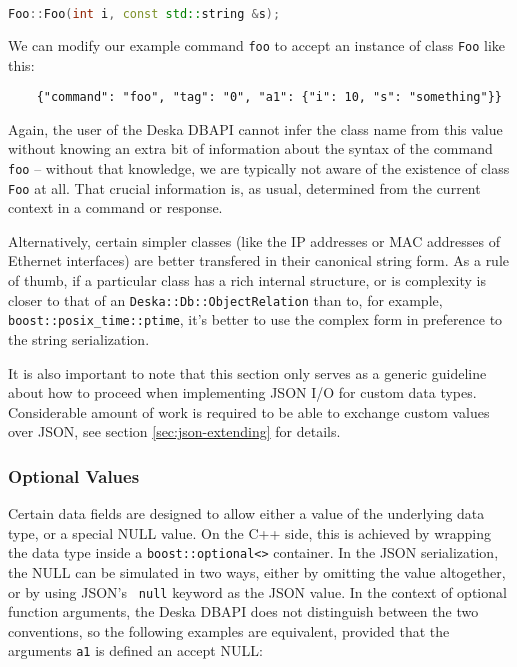 \documentclass{article}
\begin{document}
\begin{lstlisting}[language=c++]
    Foo::Foo(int i, const std::string &s);
\end{lstlisting}

We can modify our example command {\tt foo} to accept an instance of class {\tt Foo} like this:

\begin{lstlisting}
    {"command": "foo", "tag": "0", "a1": {"i": 10, "s": "something"}}
\end{lstlisting}

Again, the user of the Deska DBAPI cannot infer the class name from this value without knowing an extra bit of
information about the syntax of the command {\tt foo} -- without that knowledge, we are typically not aware of the
existence of class {\tt Foo} at all.  That crucial information is, as usual, determined from the current context in a
command or response.

Alternatively, certain simpler classes (like the IP addresses or MAC addresses of Ethernet interfaces) are better
transfered in their canonical string form.  As a rule of thumb, if a particular class has a rich internal structure, or
is complexity is closer to that of an {\tt Deska::Db::ObjectRelation} than to, for example, {\tt
boost::posix\_time::ptime}, it's better to use the complex form in preference to the string serialization.

It is also important to note that this section only serves as a generic guideline about how to proceed when implementing
JSON I/O for custom data types.  Considerable amount of work is required to be able to exchange custom values over JSON,
see section \ref{sec:json-extending} for details.

\subsubsection{Optional Values}

Certain data fields are designed to allow either a value of the underlying data type, or a special NULL value.  On the
C++ side, this is achieved by wrapping the data type inside a {\tt boost::optional<>} container.  In the JSON
serialization, the NULL can be simulated in two ways, either by omitting the value altogether, or by using JSON's {\tt
null} keyword as the JSON value.  In the context of optional function arguments, the Deska DBAPI does not distinguish
between the two conventions, so the following examples are equivalent, provided that the arguments {\tt a1} is defined
an accept NULL:
\end{document}
